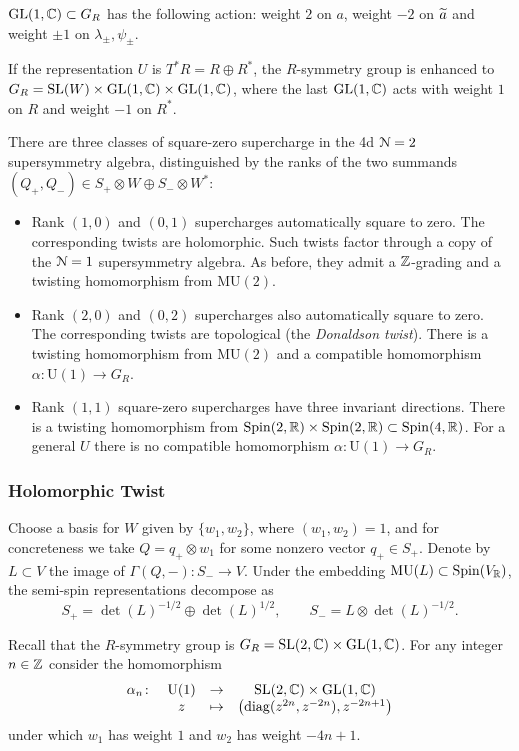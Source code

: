 \documentclass[10pt, oneside]{article}
\newcommand{\MU}{\mathrm{MU}}
\renewcommand{\U}{\mathrm{U}}
\begin{document}
$\mathrm{GL}(1, \mathbb C)\subset G_R$ has the following action: weight $2$ on $a$, weight $-2$ on $\widetilde{a}$ and weight $\pm 1$ on $\lambda_\pm,\psi_\pm$.

If the representation $U$ is $T^*R = R\oplus R^*$, the $R$-symmetry group is enhanced to $G_R=\mathrm{SL}(W)\times \mathrm{GL}(1, \mathbb C)\times \mathrm{GL}(1, \mathbb C)$, where the last $\mathrm{GL}(1, \mathbb C)$ acts with weight $1$ on $R$ and weight $-1$ on $R^*$.

There are three classes of square-zero supercharge in the 4d $\mathcal{N}=2$ supersymmetry algebra, distinguished by the ranks of the two summands $(Q_+,Q_-) \in S_+ \otimes W \oplus S_- \otimes W^*$:
\begin{itemize}
 \item Rank $(1,0)$ and $(0,1)$ supercharges automatically square to zero.  
 The corresponding twists are holomorphic.
 Such twists factor through a copy of the $\mathcal N = 1$ supersymmetry algebra. As before, they admit a $\mathbb Z$-grading and a twisting homomorphism from $\MU(2)$.
 \item Rank $(2,0)$ and $(0,2)$ supercharges also automatically square to zero. The corresponding twists are topological (the \emph{Donaldson twist}). There is a twisting homomorphism from $\MU(2)$ and a compatible homomorphism $\alpha\colon \U(1)\rightarrow G_R$.
 \item Rank $(1,1)$ square-zero supercharges have three invariant directions. There is a twisting homomorphism from $\mathrm{Spin}(2, \mathbb R)\times \mathrm{Spin}(2, \mathbb R)\subset \mathrm{Spin}(4, \mathbb R)$. For a general $U$ there is no compatible homomorphism $\alpha\colon \U(1)\rightarrow G_R$.
\end{itemize}

\subsubsection{Holomorphic Twist}
\label{sect:4d_2_holomorphictwist}

Choose a basis for $W$ given by $\{w_1, w_2\}$, where $(w_1, w_2) = 1$, and for concreteness we take $Q=q_+ \otimes w_1$ for some nonzero vector $q_+ \in S_+$. Denote by $L\subset V$ the image of $\Gamma(Q, -)\colon S_-\rightarrow V$. Under the embedding $\MU(L) \subset \Spin(V_\RR)$, the semi-spin representations decompose as
\[
S_+ = \det(L)^{-1/2} \oplus \det(L)^{1/2},\qquad S_- = L \otimes \det(L)^{-1/2} .
\]

Recall that the $R$-symmetry group is $G_R = \mathrm{SL}(2, \mathbb C) \times \mathrm{GL}(1, \mathbb C)$. For any integer $n\in\mathbb Z$ consider the homomorphism 
\[
\begin{array}{ccccc}
\alpha_n \colon & \U(1) & \rightarrow & \SL(2, \CC)\times \GL(1, \CC)\\
&  z & \mapsto & \left({\rm diag}(z^{2n}, z^{-2n}) , z^{-2n+1} \right)
\end{array}
\]
under which $w_1$ has weight $1$ and $w_2$ has weight $-4n+1$.
\end{document}
